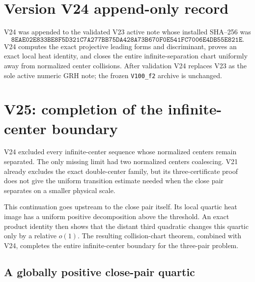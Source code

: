 \documentclass[11pt]{article}
\theoremstyle{definition}
\theoremstyle{remark}
\begin{document}
\section*{Version V24 append-only record}

V24 was appended to the validated V23 active note whose installed
SHA--256 was
\[
 \texttt{8EAE02E833BE8F5D321C7A277BB75DA428A73B670F0E541FC7006E4DB55E821E}.
 \tag{N24.31}
\]
V24 computes the exact projective leading forms and discriminant, proves
an exact local heat identity, and closes the entire infinite-separation
chart uniformly away from normalized center collisions.  After
validation V24 replaces V23 as the sole active numeric GRH note; the
frozen \texttt{V100\_f2} archive is unchanged.



\section{V25: completion of the infinite-center boundary}
\label{sec:f2v25-infinite-boundary}

V24 excluded every infinite-center sequence whose normalized centers
remain separated.  The only missing limit had two normalized centers
coalescing.  V21 already excludes the exact double-center family, but its
three-certificate proof does not give the uniform transition estimate
needed when the close pair separates on a smaller physical scale.

This continuation goes upstream to the close pair itself.  Its local
quartic heat image has a uniform positive decomposition above the
threshold.  An exact product identity then shows that the distant third
quadratic changes this quartic only by a relative \(o(1)\).  The resulting
collision-chart theorem, combined with V24, completes the entire
infinite-center boundary for the three-pair problem.

\subsection{A globally positive close-pair quartic}
\label{subsec:f2v25-quartic}
\end{document}
